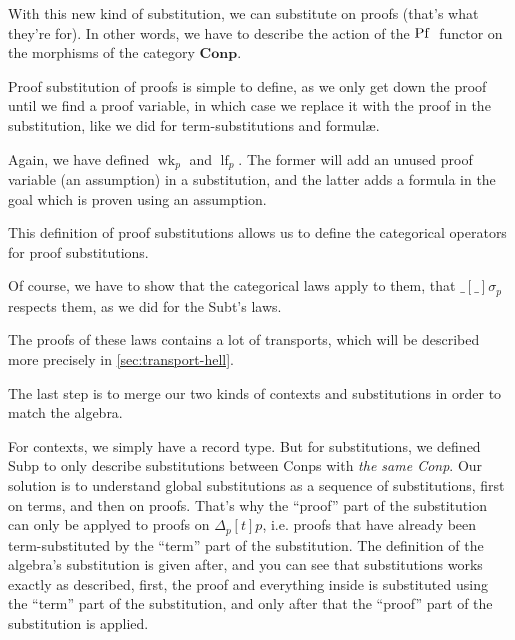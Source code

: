 \documentclass[10pt,a4paper]{article}
\begin{document}
			With this new kind of substitution, we can substitute on proofs (that's what they're for). In other words, we have to describe the action of the $\operatorname{Pf}\;$ functor on the morphisms of the category $\textbf{Conp}$.
			
			Proof substitution of proofs is simple to define, as we only get down the proof until we find a proof variable, in which case we replace it with the proof in the substitution, like we did for term-substitutions and formulæ.
			
			Again, we have defined $\operatorname{wk}_p$ and $\operatorname{lf}_p$. The former will add an unused proof variable (an assumption) in a substitution, and the latter adds a formula in the goal which is proven using an assumption.
		
			\begin{tcolorbox}
				\vspace{-2ex}
				\vspace{-7.5ex}
			\end{tcolorbox}
		
			This definition of proof substitutions allows us to define the categorical operators for proof substitutions. 
		
			Of course, we have to show that the categorical laws apply to them, that $\_[\_]\sigma_p$ respects them, as we did for the Subt's laws.
			
			The proofs of these laws contains a lot of transports, which will be described more precisely in \autoref{sec:transport-hell}.
			
			\begin{tcolorbox}
				\vspace{-2ex}
				\agda{agda/IIdCompP.tex}
				\vspace{-7.5ex}
			\end{tcolorbox}
		
			The last step is to merge our two kinds of contexts and substitutions in order to match the algebra.
			
			For contexts, we simply have a record type. But for substitutions, we defined Subp to only describe substitutions between Conp{\footnotesize s} with \emph{the same Conp}. Our solution is to understand global substitutions as a sequence of substitutions, first on terms, and then on proofs. That's why the \enquote{proof} part of the substitution can only be applyed to proofs on $\Delta_p [t]p$, i.e. proofs that have already been term-substituted by the \enquote{term} part of the substitution. The definition of the algebra's substitution is given after, and you can see that substitutions works exactly as described, first, the proof and everything inside is substituted using the \enquote{term} part of the substitution, and only after that the \enquote{proof} part of the substitution is applied.
		
\end{document}

